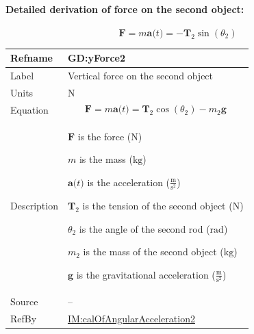 \documentclass[12pt]{article}
\begin{document}
\paragraph{Detailed derivation of force on the second object:}
\label{GD:xForce2Deriv}
\begin{displaymath}
\symbf{F}=m \symbf{a}\text{(}t\text{)}=-{\symbf{T}_{2}} \sin\left({θ_{2}}\right)
\end{displaymath}
\vspace{\baselineskip}
\noindent
\begin{minipage}{\textwidth}
\begin{tabular}{>{\raggedright}p{}>{\raggedright\arraybackslash}p{}}
\toprule \textbf{Refname} & \textbf{GD:yForce2}
\label{GD:yForce2}
\\ \midrule
Label & Vertical force on the second object
        
\\ \midrule
Units & ${\text{N}}$
        
\\ \midrule
Equation & \begin{displaymath}
           \symbf{F}=m \symbf{a}\text{(}t\text{)}={\symbf{T}_{2}} \cos\left({θ_{2}}\right)-{m_{2}} \symbf{g}
           \end{displaymath}
\\ \midrule
Description & \begin{symbDescription}
              \item{$\symbf{F}$ is the force (${\text{N}}$)}
              \item{$m$ is the mass (${\text{kg}}$)}
              \item{$\symbf{a}\text{(}t\text{)}$ is the acceleration ($\frac{\text{m}}{\text{s}^{2}}$)}
              \item{${\symbf{T}_{2}}$ is the tension of the second object (${\text{N}}$)}
              \item{${θ_{2}}$ is the angle of the second rod (${\text{rad}}$)}
              \item{${m_{2}}$ is the mass of the second object (${\text{kg}}$)}
              \item{$\symbf{g}$ is the gravitational acceleration ($\frac{\text{m}}{\text{s}^{2}}$)}
              \end{symbDescription}
\\ \midrule
Source & --
         
\\ \midrule
RefBy & \hyperref[IM:calOfAngularAcceleration2]{IM:calOfAngularAcceleration2}
        
\\ \bottomrule
\end{tabular}
\end{minipage}
\end{document}
